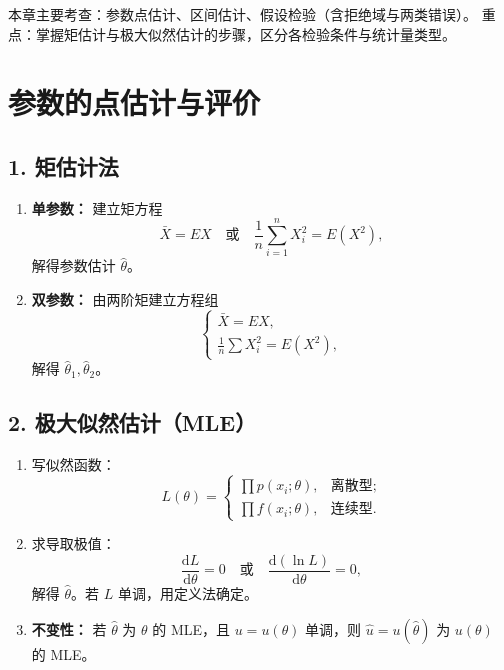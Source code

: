 
本章主要考查：参数点估计、区间估计、假设检验（含拒绝域与两类错误）。
重点：掌握矩估计与极大似然估计的步骤，区分各检验条件与统计量类型。


\section{参数的点估计与评价}

\subsection*{1. 矩估计法}

\begin{enumerate}
      \item \textbf{单参数：}
            建立矩方程
            \[
                  \bar{X} = EX
                  \quad \text{或} \quad
                  \frac{1}{n}\sum_{i=1}^{n}X_i^2 = E(X^2),
            \]
            解得参数估计 $\hat{\theta}$。
      \item \textbf{双参数：}
            由两阶矩建立方程组
            \[
                  \begin{cases}
                        \bar{X} = EX, \\[3pt]
                        \frac{1}{n}\sum X_i^2 = E(X^2),
                  \end{cases}
            \]
            解得 $\hat{\theta}_1, \hat{\theta}_2$。
\end{enumerate}

\subsection*{2. 极大似然估计（MLE）}

\begin{enumerate}
      \item 写似然函数：
            \[
                  L(\theta) =
                  \begin{cases}
                        \prod p(x_i;\theta), & \text{离散型}; \\[3pt]
                        \prod f(x_i;\theta), & \text{连续型}.
                  \end{cases}
            \]
      \item 求导取极值：
            \[
                  \frac{\mathrm{d}L}{\mathrm{d}\theta}=0
                  \quad \text{或} \quad
                  \frac{\mathrm{d}(\ln L)}{\mathrm{d}\theta}=0,
            \]
            解得 $\hat{\theta}$。若 $L$ 单调，用定义法确定。
      \item \textbf{不变性：}
            若 $\hat{\theta}$ 为 $\theta$ 的 MLE，且 $u=u(\theta)$ 单调，则 $\hat{u}=u(\hat{\theta})$ 为 $u(\theta)$ 的 MLE。
\end{enumerate}

